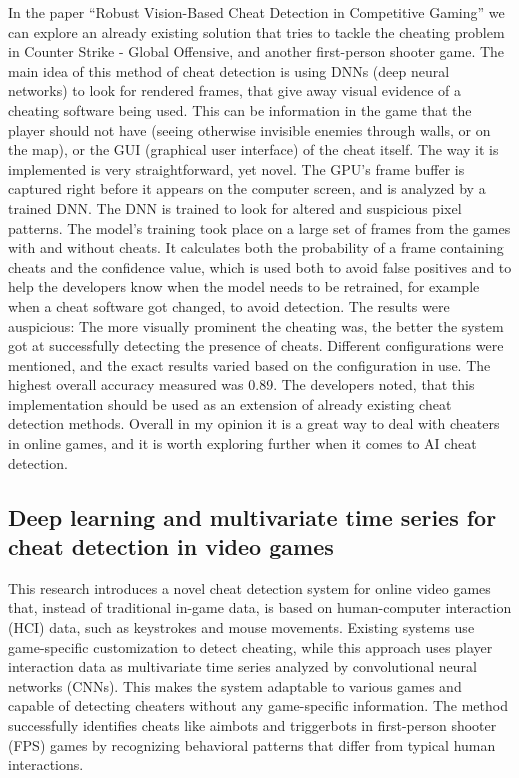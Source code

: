 In the paper “Robust Vision-Based Cheat Detection in Competitive Gaming” we can explore an
already existing solution that tries to tackle the cheating problem in Counter Strike - Global
Offensive, and another first-person shooter game. The main idea of this method of cheat
detection is using DNNs (deep neural networks) to look for rendered frames, that give away
visual evidence of a cheating software being used. This can be information in the game that the
player should not have (seeing otherwise invisible enemies through walls, or on the map), or the
GUI (graphical user interface) of the cheat itself. \newline
The way it is implemented is very straightforward, yet novel. The GPU’s frame buffer is captured
right before it appears on the computer screen, and is analyzed by a trained DNN. The DNN is
trained to look for altered and suspicious pixel patterns. The model's training took place on a
large set of frames from the games with and without cheats. It calculates both the probability of
a frame containing cheats and the confidence value, which is used both to avoid false positives
and to help the developers know when the model needs to be retrained, for example when a
cheat software got changed, to avoid detection. \newline
The results were auspicious: The more visually prominent the cheating was, the better the
system got at successfully detecting the presence of cheats. Different configurations were
mentioned, and the exact results varied based on the configuration in use. The highest overall
accuracy measured was 0.89.
The developers noted, that this implementation should be used as an extension of already
existing cheat detection methods. Overall in my opinion it is a great way to deal with cheaters in
online games, and it is worth exploring further when it comes to AI cheat detection.

\subsection{Deep learning and multivariate time series for cheat detection in video games \cite{pinto2021deep}}

This research introduces a novel cheat detection system for online video games that, instead of traditional in-game data, is based on human-computer interaction (HCI) data, such as keystrokes and mouse movements. Existing systems use game-specific customization to detect cheating, while this approach uses player interaction data as multivariate time series analyzed by convolutional neural networks (CNNs). This makes the system adaptable to various games and capable of detecting cheaters without any game-specific information. The method successfully identifies cheats like aimbots and triggerbots in first-person shooter (FPS) games by recognizing behavioral patterns that differ from typical human interactions.

